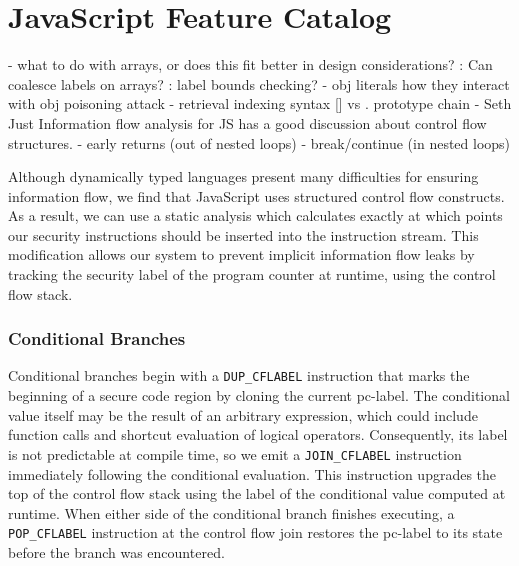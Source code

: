 
\chapter{JavaScript Feature Catalog}
 - what to do with arrays, or does this fit better in design considerations?
   : Can coalesce labels on arrays?
   : label bounds checking? 
 - obj literals
   how they interact with obj poisoning attack
 - retrieval
   indexing syntax [] vs .
   prototype chain
 - Seth Just Information flow analysis for JS has a good discussion about control flow structures.
 - early returns (out of nested loops)
 - break/continue (in nested loops)


Although dynamically typed languages present many difficulties for ensuring information flow, we find that JavaScript uses structured control flow constructs.
As a result, we can use a static analysis which calculates exactly at which points our security instructions should be inserted into the instruction stream.
This modification allows our system to prevent implicit information flow leaks by tracking the security label of the program counter at runtime, using the control flow stack.

\subsection{Conditional Branches}
Conditional branches begin with a \texttt{DUP\_CFLABEL} instruction that marks the beginning of a secure code region by cloning the current pc-label.
The conditional value itself may be the result of an arbitrary expression, which could include function calls and shortcut evaluation of logical operators.
Consequently, its label is not predictable at compile time, so we emit a \texttt{JOIN\_CFLABEL} instruction immediately following the conditional evaluation.
This instruction upgrades the top of the control flow stack using the label of the conditional value computed at runtime.
When either side of the conditional branch finishes executing, a \texttt{POP\_CFLABEL} instruction at the control flow join restores the pc-label to its state before the branch was encountered.

